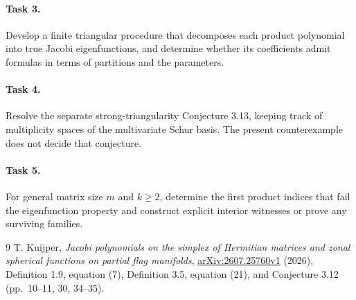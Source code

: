 \documentclass[11pt]{article}
\begin{document}
\paragraph{Task 3.}
Develop a finite triangular procedure that decomposes each product
polynomial into true Jacobi eigenfunctions, and determine whether its
coefficients admit formulas in terms of partitions and the parameters.
\paragraph{Task 4.}
Resolve the separate strong-triangularity Conjecture 3.13, keeping track
of multiplicity spaces of the multivariate Schur basis. The present
counterexample does not decide that conjecture.
\paragraph{Task 5.}
For general matrix size $m$ and $k\ge2$, determine the first product
indices that fail the eigenfunction property and construct explicit
interior witnesses or prove any surviving families.

\begin{thebibliography}{9}
 T. Kuijper, \emph{Jacobi polynomials on the simplex of Hermitian
matrices and zonal spherical functions on partial flag manifolds},
\href{https://arxiv.org/abs/2607.25760v1}{arXiv:2607.25760v1} (2026),
Definition 1.9, equation (7), Definition 3.5, equation (21), and
Conjecture 3.12 (pp.~10--11, 30, 34--35).
\end{thebibliography}
\end{document}
